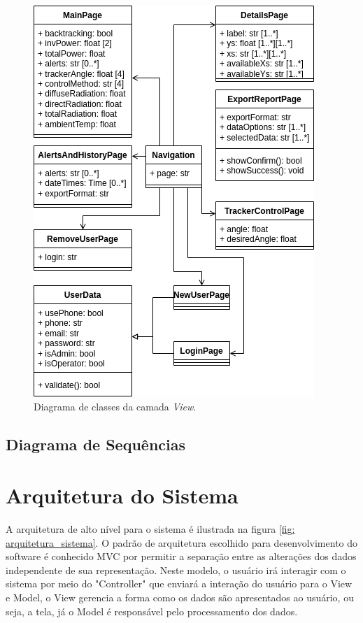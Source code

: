\documentclass[a4paper,12pt]{article}
\begin{document}
\begin{figure}
    \centering
    \includegraphics[width=\linewidth]{diagrama de classes - view.drawio.png}
    \caption{Diagrama de classes da camada \textit{View}.}
    \label{fig:diagrama-classes-view}
\end{figure}

\subsection{Diagrama de Sequências}

\section{Arquitetura do Sistema}
A arquitetura de alto nível para o sistema é ilustrada na figura \ref{fig: arquitetura_sistema}. O padrão de arquitetura escolhido para desenvolvimento do software é conhecido MVC por permitir a separação entre as alterações dos dados independente de sua representação. Neste modelo, o usuário irá interagir com o sistema por meio do "Controller" que enviará a interação do usuário para o View e Model, o View gerencia a forma como os dados são apresentados ao usuário, ou seja, a tela, já o Model é responsável pelo processamento dos dados.
\end{document}
